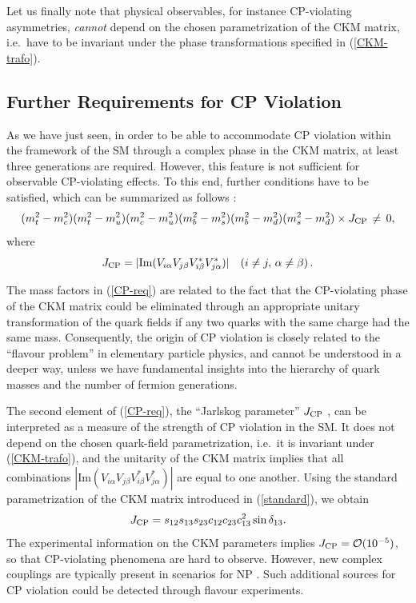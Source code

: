 \documentclass[11pt]{cernrep}
\begin{document}
Let us finally note that physical observables, for instance CP-violating
asymmetries, {\it cannot} depend on the chosen parametrization of the CKM 
matrix, i.e.\ have to be invariant under the phase transformations specified 
in (\ref{CKM-trafo}). 


%
%
%
\subsection{Further Requirements for CP Violation}
%
%
%
As we have just seen, in order to be able to accommodate CP violation within 
the framework of the SM through a complex phase in the CKM matrix, at least 
three generations are required. However, this feature is not sufficient for 
observable CP-violating effects. To this end, further conditions have to 
be satisfied, which can be summarized as follows \cite{jarlskog,BBG}:
\begin{equation}\label{CP-req}
(m_t^2-m_c^2)(m_t^2-m_u^2)(m_c^2-m_u^2)
(m_b^2-m_s^2)(m_b^2-m_d^2)(m_s^2-m_d^2)\times J_{\rm CP}\,\not=\,0,
\end{equation}
where
\begin{equation}\label{JCP}
J_{\rm CP}=|\mbox{Im}(V_{i\alpha}V_{j\beta}V_{i\beta}^\ast 
V_{j\alpha}^\ast)|\quad(i\not=j,\,\alpha\not=\beta)\,.
\end{equation}

The mass factors in (\ref{CP-req}) are related to the fact that the 
CP-violating phase of the CKM matrix could be eliminated through an 
appropriate unitary transformation of the quark fields if any two quarks 
with the same charge had the same mass. Consequently, the origin 
of CP violation is closely related to the ``flavour problem'' in
elementary particle physics, and cannot be understood in a deeper 
way, unless we have fundamental insights into the hierarchy of quark 
masses and the number of fermion generations.

The second element of (\ref{CP-req}), the ``Jarlskog parameter'' 
$J_{\rm CP}$ \cite{jarlskog}, can be interpreted as a measure of the 
strength of CP violation in the SM. It does not depend on the chosen 
quark-field parametrization, i.e.\ it is invariant under (\ref{CKM-trafo}), 
and the unitarity of the CKM matrix implies that all combinations 
$|\mbox{Im}(V_{i\alpha}V_{j\beta}V_{i\beta}^\ast V_{j\alpha}^\ast)|$ 
are equal to one another. Using the standard parametrization of the
CKM matrix introduced in (\ref{standard}), we obtain
\begin{equation}\label{JCP-PDG}
J_{\rm CP}=s_{12}s_{13}s_{23}c_{12}c_{23}c_{13}^2\sin\delta_{13}.
\end{equation}
The  experimental information on the CKM parameters implies 
$J_{\rm CP}={\cal O}(10^{-5})$, so that
CP-violating phenomena are hard to observe.  However, new complex couplings 
are typically present in scenarios for NP \cite{ellis}. Such additional sources
for CP violation could be detected through flavour experiments. 
\end{document}
